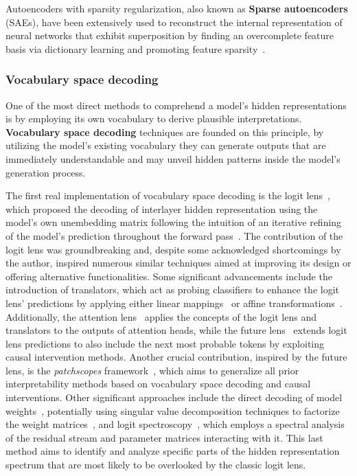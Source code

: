 
Autoencoders with sparsity regularization, also known as \textbf{Sparse autoencoders} (SAEs), have been extensively used to reconstruct the internal representation of neural networks that exhibit superposition by finding an overcomplete feature basis via dictionary learning and promoting feature sparsity~\cite{bricken2023, huben2024}.

\subsubsection{Vocabulary space decoding}

One of the most direct methods to comprehend a model's hidden representations is by employing its own vocabulary to derive plausible interpretations. \textbf{Vocabulary space decoding} techniques are founded on this principle, by utilizing the model's existing vocabulary they can generate outputs that are immediately understandable and may unveil hidden patterns inside the model's generation process.

The first real implementation of vocabulary space decoding is the logit lens~\cite{nostalgebraist2020}, which proposed the decoding of interlayer hidden representation using the model's own unembedding matrix following the intuition of an iterative refining of the model's prediction throughout the forward pass~\cite{jastrzebski2018}.
The contribution of the logit lens was groundbreaking and, despite some acknowledged shortcomings by the author, inspired numerous similar techniques aimed at improving its design or offering alternative functionalities.
Some significant advancements include the introduction of translators, which act as probing classifiers to enhance the logit lens' predictions by applying either linear mappings~\cite{din2024} or affine transformations~\cite{belrose2023a}.
Additionally, the attention lens~\cite{sakarvadia2023} applies the concepts of the logit lens and translators to the outputs of attention heads, while the future lens~\cite{pal2023} extends logit lens predictions to also include the next most probable tokens by exploiting causal intervention methods.
Another crucial contribution, inspired by the future lens, is the \emph{patchscopes} framework~\cite{ghandeharioun2024}, which aims to generalize all prior interpretability methods based on vocabulary space decoding and causal interventions.
Other significant approaches include the direct decoding of model weights~\cite{dar2023}, potentially using singular value decomposition techniques to factorize the weight matrices~\cite{millidge2022}, and logit spectroscopy~\cite{cancedda2024}, which employs a spectral analysis of the residual stream and parameter matrices interacting with it.
This last method aims to identify and analyze specific parts of the hidden representation spectrum that are most likely to be overlooked by the classic logit lens.

